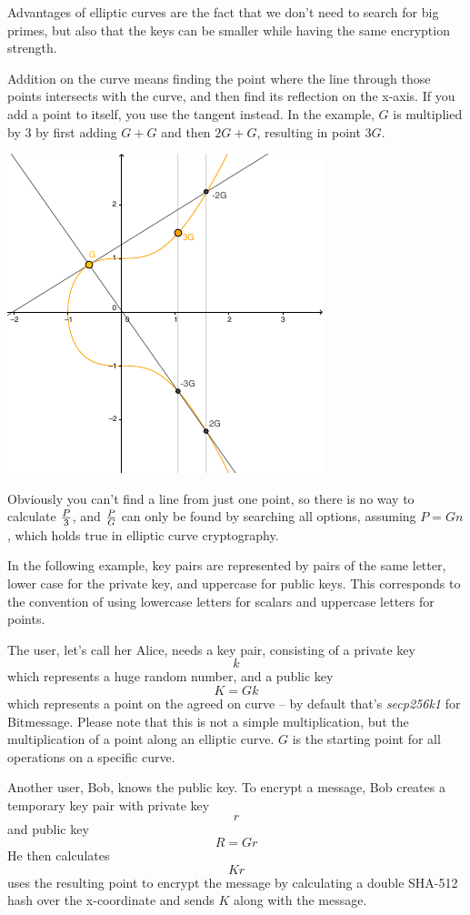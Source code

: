 \documentclass{bfh}
\begin{document}
  Advantages of elliptic curves are the fact that we don't need to search for big primes, but also that the keys can be smaller while having the same encryption strength.

  Addition on the curve means finding the point where the line through those points intersects with the curve, and then find its reflection on the x-axis. If you add a point to itself, you use the tangent instead. In the example, $G$ is multiplied by 3 by first adding $G+G$ and then $2G+G$, resulting in point $3G$.

  \begin{center}
    \includegraphics[width=0.5 \textwidth]{images/multiplication_on_elliptic_curve.pdf}
  \end{center}

  Obviously you can't find a line from just one point, so there is no way to calculate $P \over 3$, and $P \over G$ can only be found by searching all options, assuming $P = G n$, which holds true in elliptic curve cryptography.

  In the following example, key pairs are represented by pairs of the same letter, lower case for the private key, and uppercase for public keys. This corresponds to the convention of using lowercase letters for scalars and uppercase letters for points.

  The user, let's call her Alice, needs a key pair, consisting of a private key
$$k$$
which represents a huge random number, and a public key
$$K = G k$$
which represents a point on the agreed on curve -- by default that's \textit{secp256k1} for Bitmessage. Please note that this is not a simple multiplication, but the multiplication of a point along an elliptic curve. $G$ is the starting point for all operations on a specific curve.

  Another user, Bob, knows the public key. To encrypt a message, Bob creates a temporary key pair with private key
$$r$$
and public key
$$R = G r$$
He then calculates
$$K r$$
uses the resulting point to encrypt the message by calculating a double SHA-512 hash over the x-coordinate and sends $K$ along with the message.
\end{document}
